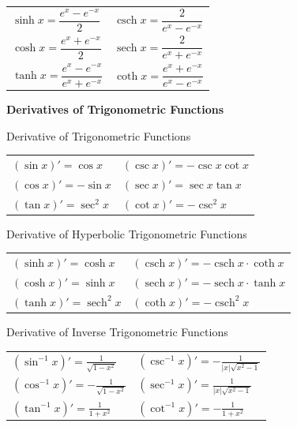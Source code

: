 \documentclass{article}
\DeclareMathOperator{\sech}{sech}
\DeclareMathOperator{\csch}{csch}
\begin{document}
\begin{center}
{\renewcommand{\arraystretch}{2}
\begin{tabular}{ll}
$\sinh x = \dfrac{e^x - e^{-x}}{2}$ & $\csch x = \dfrac{2}{e^x - e^{-x}}$\\
 $\cosh x = \dfrac{e^x + e^{-x}}{2}$ & $\sech x = \dfrac{2}{e^x + e^{-x}}$\\
 $\tanh x = \dfrac{e^x - e^{-x}}{e^x + e^{-x}}$ & $\coth x = \dfrac{e^x + e^{-x}}{e^x - e^{-x}}$
\end{tabular}}

\vspace{0.5cm}

\textbf{Derivatives of Trigonometric Functions}

\vspace{0.3cm}

\begin{minipage}{0.4\linewidth}

\centerline{Derivative of Trigonometric Functions}

\begin{tabular}{ll}
$(\sin x)' = \cos x$ & $(\csc x)' = -\csc x \cot x$\\
$(\cos x)' = -\sin x$ & $(\sec x)' = \sec x \tan x$\\
$(\tan x)' = \sec^2 x$ & $(\cot x)' = -\csc^2 x$
\end{tabular}
\end{minipage}
\hspace{0.3cm}
\begin{minipage}{0.55\linewidth}

\centerline{Derivative of Hyperbolic Trigonometric Functions}

\begin{tabular}{ll}
$(\sinh x)' = \cosh x$ & $(\csch x)' = -\csch x \cdot \coth x$\\
$(\cosh x)' = \sinh x$ & $(\sech x)' = -\sech x \cdot \tanh x$\\
$(\tanh x)' = \sech^{2} x$ & $(\coth x)' = -\csch^2 x$\\
\end{tabular}
\end{minipage}

\vspace{0.5cm}

\begin{minipage}{0.45\linewidth}

\centerline{Derivative of Inverse Trigonometric Functions}

\begin{tabular}{ll}
$(\sin^{-1} x)' = \displaystyle\frac{1}{\sqrt{1-x^2}}$ & $(\csc^{-1} x )' = \displaystyle - \frac{1}{|x|\sqrt{x^2 - 1}}$\\
$(\cos^{-1} x)' = - \displaystyle\frac{1}{\sqrt{1-x^2}}$ & $(\sec^{-1} x )' = \displaystyle \frac{1}{|x|\sqrt{x^2 - 1}}$\\
$(\tan^{-1} x )' = \displaystyle\frac{1}{1+x^2}$ & $(\cot^{-1} x )' = -\displaystyle\frac{1}{1 + x^2}$
\end{tabular}
\end{minipage}


\end{center}
\end{document}
